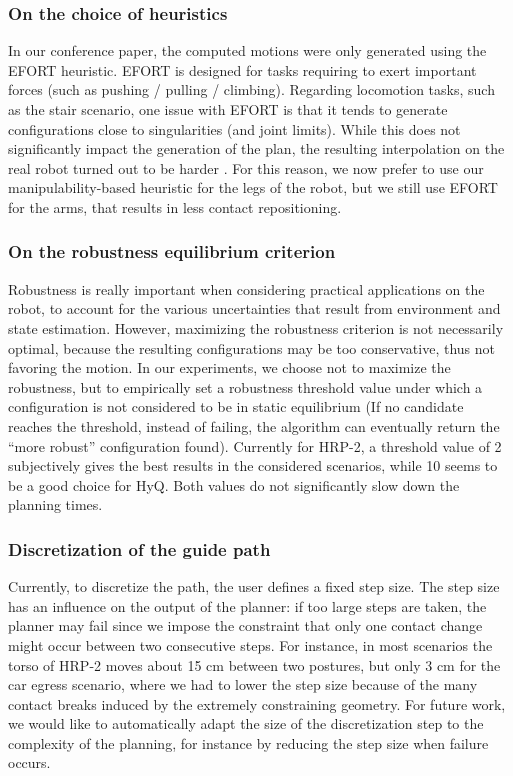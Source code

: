 \subsubsection{On the choice of heuristics} \label{sec:heuristichoices}
In our conference paper, the computed motions were only generated using the EFORT heuristic.
EFORT is designed for tasks requiring to exert important forces (such as pushing / pulling / climbing). 
Regarding locomotion tasks, such as the stair scenario, one issue with EFORT is that it tends to generate
configurations close to singularities (and joint limits). While this does not significantly impact
the generation of the plan, the resulting interpolation on the real robot turned out to be harder \citep{Carpentier2016}.
For this reason, we now prefer to use our manipulability-based heuristic for the legs of the robot, but we still
use EFORT for the arms, that results in less contact repositioning.

\subsubsection{On the robustness equilibrium criterion} \label{sec:parrob}
Robustness is really important when considering practical applications on the robot, to account 
for the various uncertainties that result from environment and state estimation. However,
maximizing the robustness criterion is not necessarily optimal, because the resulting configurations may be too conservative, thus not favoring the motion. In our experiments, we choose not to maximize the robustness,
but to empirically set a robustness threshold value under which a configuration is not considered to be in
static equilibrium (If no candidate reaches the threshold, instead of failing, the algorithm can eventually return the ``more robust'' configuration
found). Currently for HRP-2, a threshold value of 2 subjectively gives the best results in the considered scenarios, while 10 seems to be a good choice for HyQ. Both values do not
significantly slow down the planning times.

\subsubsection{Discretization of the guide path} \label{sec:disc}
Currently, to discretize the path, the user defines a fixed step size. The step size
has an influence on the output of the planner: if too large steps are taken,
the planner may fail since we impose the constraint that only one contact change might occur
between two consecutive steps. For instance, in most scenarios the torso of HRP-2 moves about 15 cm between two postures, but only 3 cm
for the car egress scenario, where we had to lower the step size because of the many contact breaks induced by the extremely constraining geometry.
For future work, we would like to automatically adapt the size of the discretization step to the complexity of the planning, for instance
by reducing the step size when failure occurs.

